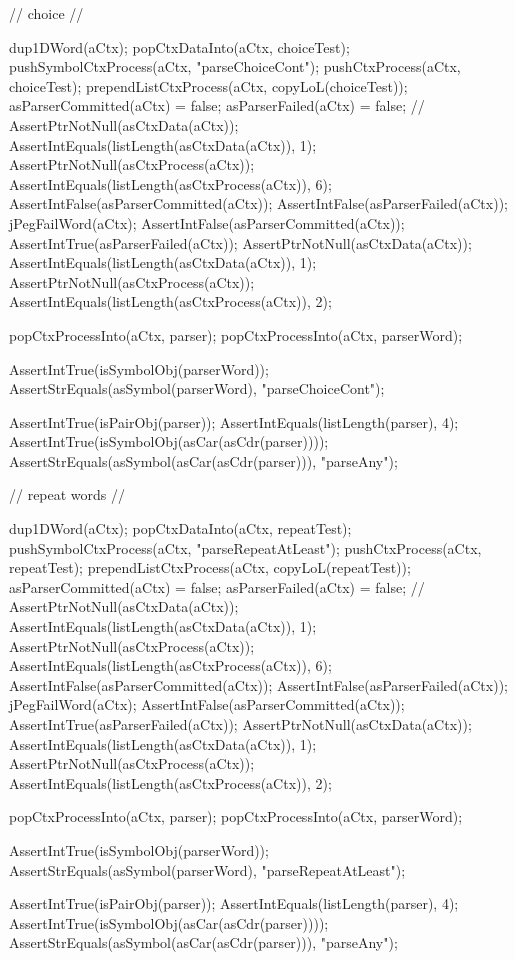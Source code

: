   // choice 
  //
  {
  dup1DWord(aCtx);
  popCtxDataInto(aCtx, choiceTest);
  pushSymbolCtxProcess(aCtx, "parseChoiceCont");
  pushCtxProcess(aCtx, choiceTest);
  prependListCtxProcess(aCtx, copyLoL(choiceTest));
  asParserCommitted(aCtx) = false;
  asParserFailed(aCtx) = false;
  //
  AssertPtrNotNull(asCtxData(aCtx));
  AssertIntEquals(listLength(asCtxData(aCtx)), 1);
  AssertPtrNotNull(asCtxProcess(aCtx));
  AssertIntEquals(listLength(asCtxProcess(aCtx)), 6);
  AssertIntFalse(asParserCommitted(aCtx));
  AssertIntFalse(asParserFailed(aCtx));
  jPegFailWord(aCtx);
  AssertIntFalse(asParserCommitted(aCtx));
  AssertIntTrue(asParserFailed(aCtx));
  AssertPtrNotNull(asCtxData(aCtx));
  AssertIntEquals(listLength(asCtxData(aCtx)), 1);
  AssertPtrNotNull(asCtxProcess(aCtx));
  AssertIntEquals(listLength(asCtxProcess(aCtx)), 2);
  
  popCtxProcessInto(aCtx, parser);
  popCtxProcessInto(aCtx, parserWord);
  
  AssertIntTrue(isSymbolObj(parserWord));
  AssertStrEquals(asSymbol(parserWord), "parseChoiceCont");
  
  AssertIntTrue(isPairObj(parser));
  AssertIntEquals(listLength(parser), 4);
  AssertIntTrue(isSymbolObj(asCar(asCdr(parser))));
  AssertStrEquals(asSymbol(asCar(asCdr(parser))), "parseAny");
  }

  // repeat words
  //
  {
  dup1DWord(aCtx);
  popCtxDataInto(aCtx, repeatTest);
  pushSymbolCtxProcess(aCtx, "parseRepeatAtLeast");
  pushCtxProcess(aCtx, repeatTest);
  prependListCtxProcess(aCtx, copyLoL(repeatTest));
  asParserCommitted(aCtx) = false;
  asParserFailed(aCtx) = false;
  //
  AssertPtrNotNull(asCtxData(aCtx));
  AssertIntEquals(listLength(asCtxData(aCtx)), 1);
  AssertPtrNotNull(asCtxProcess(aCtx));
  AssertIntEquals(listLength(asCtxProcess(aCtx)), 6);
  AssertIntFalse(asParserCommitted(aCtx));
  AssertIntFalse(asParserFailed(aCtx));
  jPegFailWord(aCtx);
  AssertIntFalse(asParserCommitted(aCtx));
  AssertIntTrue(asParserFailed(aCtx));
  AssertPtrNotNull(asCtxData(aCtx));
  AssertIntEquals(listLength(asCtxData(aCtx)), 1);
  AssertPtrNotNull(asCtxProcess(aCtx));
  AssertIntEquals(listLength(asCtxProcess(aCtx)), 2);
  
  popCtxProcessInto(aCtx, parser);
  popCtxProcessInto(aCtx, parserWord);
  
  AssertIntTrue(isSymbolObj(parserWord));
  AssertStrEquals(asSymbol(parserWord), "parseRepeatAtLeast");
  
  AssertIntTrue(isPairObj(parser));
  AssertIntEquals(listLength(parser), 4);
  AssertIntTrue(isSymbolObj(asCar(asCdr(parser))));
  AssertStrEquals(asSymbol(asCar(asCdr(parser))), "parseAny");
  }

